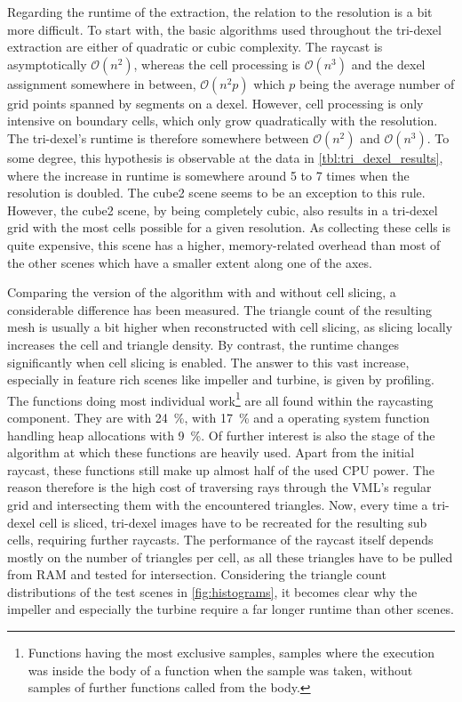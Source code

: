Regarding the runtime of the extraction, the relation to the resolution is a bit more difficult.
To start with, the basic algorithms used throughout the tri-dexel extraction are either of quadratic or cubic complexity.
The raycast is asymptotically $\mathcal{O}(n^2)$, whereas the cell processing is $\mathcal{O}(n^3)$ and the dexel assignment somewhere in between, $\mathcal{O}(n^2p)$ which $p$ being the average number of grid points spanned by segments on a dexel.
However, cell processing is only intensive on boundary cells, which only grow quadratically with the resolution.
The tri-dexel's runtime is therefore somewhere between $\mathcal{O}(n^2)$ and $\mathcal{O}(n^3)$.
To some degree, this hypothesis is observable at the data in \cref{tbl:tri_dexel_results}, where the increase in runtime is somewhere around 5 to 7 times when the resolution is doubled.
The cube2 scene seems to be an exception to this rule.
However, the cube2 scene, by being completely cubic, also results in a tri-dexel grid with the most cells possible for a given resolution.
As collecting these cells is quite expensive, this scene has a higher, memory-related overhead than most of the other scenes which have a smaller extent along one of the axes.

Comparing the version of the algorithm with and without cell slicing, a considerable difference has been measured.
The triangle count of the resulting mesh is usually a bit higher when reconstructed with cell slicing, as slicing locally increases the cell and triangle density.
By contrast, the runtime changes significantly when cell slicing is enabled.
The answer to this vast increase, especially in feature rich scenes like impeller and turbine, is given by profiling.
The functions doing most individual work\footnote{
	Functions having the most exclusive samples, \ie samples where the execution was inside the body of a function when the sample was taken, without samples of further functions called from the body.}
are all found within the raycasting component.
They are  with \SI{24}{\percent},  with \SI{17}{\percent} and a operating system function handling heap allocations with \SI{9}{\percent}.
Of further interest is also the stage of the algorithm at which these functions are heavily used.
Apart from the initial raycast, these functions still make up almost half of the used CPU power.
The reason therefore is the high cost of traversing rays through the VML's regular grid and intersecting them with the encountered triangles.
Now, every time a tri-dexel cell is sliced, tri-dexel images have to be recreated for the resulting sub cells, requiring further raycasts.
The performance of the raycast itself depends mostly on the number of triangles per cell, as all these triangles have to be pulled from RAM and tested for intersection.
Considering the triangle count distributions of the test scenes in \cref{fig:histograms}, it becomes clear why the impeller and especially the turbine require a far longer runtime than other scenes.

